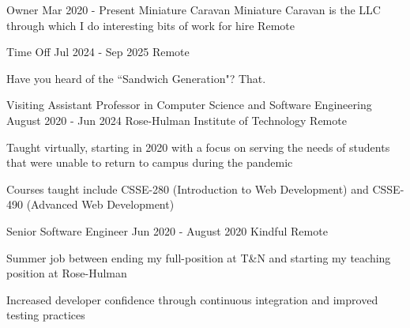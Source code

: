 

\begin{cventries}

  \cventrywithorganizationnote
  {Owner}
  {Mar 2020 - Present}
  {Miniature Caravan}
  {Miniature Caravan is the LLC through which I do interesting bits of work for hire}
  {Remote}
  {
    \cvtags{
      \tagRuby
      \tagRails
      \tagHAML
      \tagSASS
      \tagAirtable
      \tagPostgreSQL
      \tagTDDShort
      \tagProjectManagement
    }
  }

  \cventrywithorganizationnote
  {Time Off}
  {Jul 2024 - Sep 2025}
  {}
  {} %
  {Remote}
  {
    \begin{cvitems}
      \item Have you heard of the ``Sandwich Generation"? That.
    \end{cvitems}
    \cvtags{
      \tagAirtable
      \tagProjectManagement
      \tagTeaching
    }
  }

  \cventry
  {Visiting Assistant Professor in Computer Science and Software Engineering}
  {August 2020 - Jun 2024}
  {Rose-Hulman Institute of Technology}
  {Remote}
  {
    \begin{cvitems}
      \item Taught virtually, starting in 2020 with a focus on serving the needs of students that were unable to return to campus during the pandemic
      \item Courses taught include CSSE-280 (Introduction to Web Development) and CSSE-490 (Advanced Web Development)
    \end{cvitems}
    \cvtags{
      \tagCSS
      \tagHTML
      \tagJavaScript
      \tagPython
      \tagSASS
      \tagFlask
      \tagReact
      \tagAirtable
      \tagSQLite
      \tagFigma
      \tagTeaching
      \tagTDDShort
    }
  }

  \cventry
  {Senior Software Engineer}
  {Jun 2020 - August 2020}
  {Kindful}
  {Remote}
  {
    \begin{cvitems}
      \item Summer job between ending my full-position at T\&N and starting my teaching position at Rose-Hulman
      \item Increased developer confidence through continuous integration and improved testing practices
    \end{cvitems}
    \cvtags{
      \tagRuby
      \tagRails
      \tagPostgreSQL
      \tagCIShort
      \tagTDDShort
    }
  }


\end{cventries}
